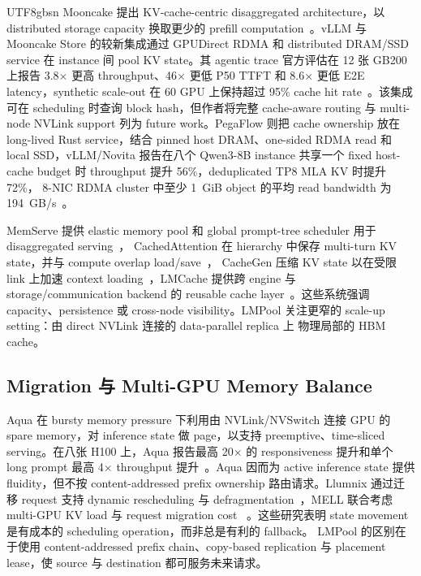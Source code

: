 \documentclass[11pt,a4paper]{article}
\newcommand{\sys}{LMPool}
\begin{document}
\begin{CJK*}{UTF8}{gbsn}
Mooncake 提出 KV-cache-centric disaggregated architecture，以 distributed storage capacity 换取更少的
prefill computation~\citep{Mooncake}。vLLM 与 Mooncake Store 的较新集成通过 GPUDirect RDMA 和 distributed
DRAM/SSD service 在 instance 间 pool KV state。其 agentic trace 官方评估在 12 张 GB200 上报告 3.8$\times$
更高 throughput、46$\times$ 更低 P50 TTFT 和 8.6$\times$ 更低 E2E latency，synthetic scale-out 在 60 GPU
上保持超过 95\% cache hit rate~\citep{MooncakeStore}。该集成可在 scheduling 时查询 block hash，但作者将完整
cache-aware routing 与 multi-node NVLink support 列为 future work。PegaFlow 则把 cache ownership 放在 long-lived
Rust service，结合 pinned host DRAM、one-sided RDMA read 和 local SSD，vLLM/Novita 报告在八个 Qwen3-8B
instance 共享一个 fixed host-cache budget 时 throughput 提升 56\%，deduplicated TP8 MLA KV 时提升 72\%，
8-NIC RDMA cluster 中至少 1~GiB object 的平均 read bandwidth 为 194~GB/s~\citep{PegaFlow}。

MemServe 提供 elastic memory pool 和 global prompt-tree scheduler 用于 disaggregated serving~\citep{MemServe}，
CachedAttention 在 hierarchy 中保存 multi-turn KV state，并与 compute overlap load/save~\citep{CachedAttention}，
CacheGen 压缩 KV state 以在受限 link 上加速 context loading~\citep{CacheGen}，LMCache 提供跨 engine 与
storage/communication backend 的 reusable cache layer~\citep{LMCache}。这些系统强调 capacity、persistence 或
cross-node visibility。\sys{} 关注更窄的 scale-up setting：由 direct NVLink 连接的 data-parallel replica 上
物理局部的 HBM cache。

\subsection{Migration 与 Multi-GPU Memory Balance}

Aqua 在 bursty memory pressure 下利用由 NVLink/NVSwitch 连接 GPU 的 spare memory，对 inference state 做
page，以支持 preemptive、time-sliced serving。在八张 H100 上，Aqua 报告最高 20$\times$ 的 responsiveness
提升和单个 long prompt 最高 4$\times$ throughput 提升~\citep{Aqua}。Aqua 因而为 active inference state
提供 fluidity，但不按 content-addressed prefix ownership 路由请求。Llumnix 通过迁移 request 支持 dynamic
rescheduling 与 defragmentation~\citep{Llumnix}，MELL 联合考虑 multi-GPU KV load 与 request migration cost
~\citep{MELL}。这些研究表明 state movement 是有成本的 scheduling operation，而非总是有利的 fallback。
\sys{} 的区别在于使用 content-addressed prefix chain、copy-based replication 与 placement lease，使 source
与 destination 都可服务未来请求。


\end{CJK*}
\end{document}

